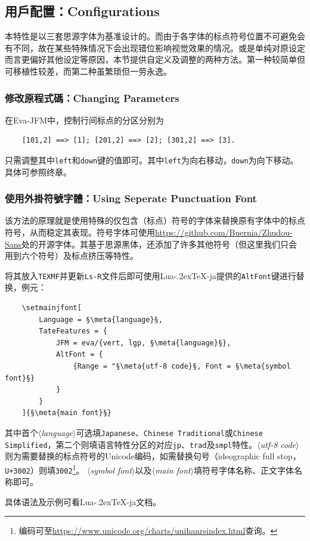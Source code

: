 \documentclass{ltjsarticle}
\def\meta#1{{\normalfont\rmfamily\itshape$\langle$#1\/$\rangle$}}
\def\段{\par}
\def\LuaTeX{Lua\kern-.2ex\TeX}
\begin{document}
\subsection{用戶配置：Configurations}\label{sec:config}
本特性是以三套思源字体为基准设计的。而由于各字体的标点符号位置不可避免会有不同，故在某些特殊情况下会出现错位影响视觉效果的情况。或是单纯对原设定而言更偏好其他设定等原因，本节提供自定义及调整的两种方法。第一种较简单但可移植性较差，而第二种虽繁琐但一劳永逸。

\subsubsection{修改原程式碼：Changing Parameters}
在\textsf{Eva-JFM}中，控制行间标点的分区分别为
\begin{lstlisting}
    [101,2] ==> [1]; [201,2] ==> [2]; [301,2] ==> [3].
\end{lstlisting}
只需调整其中\texttt{left}和\texttt{down}键的值即可。其中\texttt{left}为向右移动，\texttt{down}为向下移动。
具体可参照终章。

\subsubsection{使用外掛符號字體：Using Seperate Punctuation Font}
该方法的原理就是使用特殊的仅包含（标点）符号的字体来替换原有字体中的标点符号，从而稳定其表现。符号字体可使用\url{https://github.com/Buernia/Zhudou-Sans}处的开源字体。其基于思源黑体，还添加了许多其他符号（但这里我们只会用到六个符号）及标点挤压等特性。\段
将其放入\texttt{TEXMF}并更新\texttt{Ls-R}文件后即可使用\LuaTeX-ja提供的\texttt{AltFont}键进行替换，例元：
\begin{lstlisting}
    \setmainjfont[
        Language = §\meta{language}§,
        TateFeatures = {
            JFM = eva/{vert, lgp, §\meta{language}§},
            AltFont = {
                {Range = "§\meta{utf-8 code}§, Font = §\meta{symbol font}§}
            }
        }
    ]{§\meta{main font}§}
\end{lstlisting}
其中首个\meta{language}可选填\texttt{Japanese}、\texttt{Chinese Traditional}或\texttt{Chinese Simplified}，第二个则填语言特性分区的对应\texttt{jp}、\texttt{trad}及\texttt{smpl}特性。\meta{utf-8 code}则为需要替换的标点符号的Unicode编码，如需替换句号（ideographic full stop，\texttt{U+3002}）则填\texttt{3002}\footnote{编码可至\url{https://www.unicode.org/charts/unihanrsindex.html}查询。}。
\meta{symbol font}以及\meta{main font}填符号字体名称、正文字体名称即可。\段
具体语法及示例可看\LuaTeX-ja文档\cite{luatexja-doc}。
\end{document}
